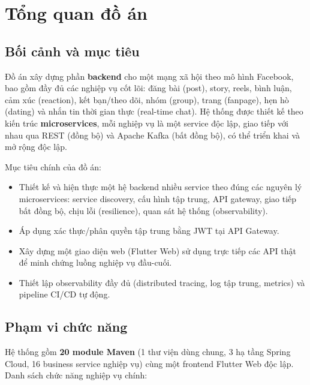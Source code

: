\documentclass[12pt,a4paper]{report}
\begin{document}
\tableofcontents
\clearpage

\chapter{Tổng quan đồ án}

\section{Bối cảnh và mục tiêu}

Đồ án xây dựng phần \textbf{backend} cho một mạng xã hội theo mô hình Facebook,
bao gồm đầy đủ các nghiệp vụ cốt lõi: đăng bài (post), story, reels, bình luận,
cảm xúc (reaction), kết bạn/theo dõi, nhóm (group), trang (fanpage), hẹn hò
(dating) và nhắn tin thời gian thực (real-time chat). Hệ thống được thiết kế
theo kiến trúc \textbf{microservices}, mỗi nghiệp vụ là một service độc lập,
giao tiếp với nhau qua REST (đồng bộ) và Apache Kafka (bất đồng bộ), có thể
triển khai và mở rộng độc lập.

Mục tiêu chính của đồ án:
\begin{itemize}[nosep]
    \item Thiết kế và hiện thực một hệ backend nhiều service theo đúng các
    nguyên lý microservices: service discovery, cấu hình tập trung, API
    gateway, giao tiếp bất đồng bộ, chịu lỗi (resilience), quan sát hệ thống
    (observability).
    \item Áp dụng xác thực/phân quyền tập trung bằng JWT tại API Gateway.
    \item Xây dựng một giao diện web (Flutter Web) sử dụng trực tiếp các API
    thật để minh chứng luồng nghiệp vụ đầu-cuối.
    \item Thiết lập observability đầy đủ (distributed tracing, log tập trung,
    metrics) và pipeline CI/CD tự động.
\end{itemize}

\section{Phạm vi chức năng}

Hệ thống gồm \textbf{20 module Maven} (1 thư viện dùng chung, 3 hạ tầng
Spring Cloud, 16 business service nghiệp vụ) cùng một frontend Flutter Web độc
lập. Danh sách chức năng nghiệp vụ chính:
\end{document}
